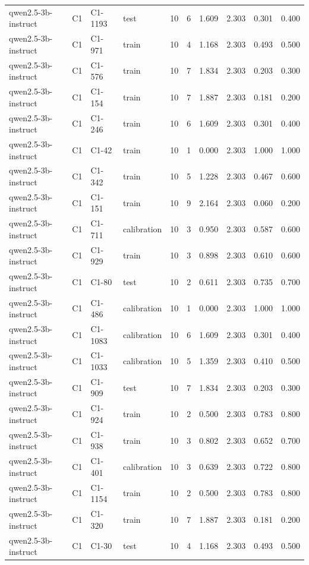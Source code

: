 \begin{table}
\begin{tabular}{llllrrrrrr}
qwen2.5-3b-instruct & C1 & C1-1193 & test & 10 & 6 & 1.609 & 2.303 & 0.301 & 0.400 \\
qwen2.5-3b-instruct & C1 & C1-971 & train & 10 & 4 & 1.168 & 2.303 & 0.493 & 0.500 \\
qwen2.5-3b-instruct & C1 & C1-576 & train & 10 & 7 & 1.834 & 2.303 & 0.203 & 0.300 \\
qwen2.5-3b-instruct & C1 & C1-154 & train & 10 & 7 & 1.887 & 2.303 & 0.181 & 0.200 \\
qwen2.5-3b-instruct & C1 & C1-246 & train & 10 & 6 & 1.609 & 2.303 & 0.301 & 0.400 \\
qwen2.5-3b-instruct & C1 & C1-42 & train & 10 & 1 & 0.000 & 2.303 & 1.000 & 1.000 \\
qwen2.5-3b-instruct & C1 & C1-342 & train & 10 & 5 & 1.228 & 2.303 & 0.467 & 0.600 \\
qwen2.5-3b-instruct & C1 & C1-151 & train & 10 & 9 & 2.164 & 2.303 & 0.060 & 0.200 \\
qwen2.5-3b-instruct & C1 & C1-711 & calibration & 10 & 3 & 0.950 & 2.303 & 0.587 & 0.600 \\
qwen2.5-3b-instruct & C1 & C1-929 & train & 10 & 3 & 0.898 & 2.303 & 0.610 & 0.600 \\
qwen2.5-3b-instruct & C1 & C1-80 & test & 10 & 2 & 0.611 & 2.303 & 0.735 & 0.700 \\
qwen2.5-3b-instruct & C1 & C1-486 & calibration & 10 & 1 & 0.000 & 2.303 & 1.000 & 1.000 \\
qwen2.5-3b-instruct & C1 & C1-1083 & calibration & 10 & 6 & 1.609 & 2.303 & 0.301 & 0.400 \\
qwen2.5-3b-instruct & C1 & C1-1033 & calibration & 10 & 5 & 1.359 & 2.303 & 0.410 & 0.500 \\
qwen2.5-3b-instruct & C1 & C1-909 & test & 10 & 7 & 1.834 & 2.303 & 0.203 & 0.300 \\
qwen2.5-3b-instruct & C1 & C1-924 & train & 10 & 2 & 0.500 & 2.303 & 0.783 & 0.800 \\
qwen2.5-3b-instruct & C1 & C1-938 & train & 10 & 3 & 0.802 & 2.303 & 0.652 & 0.700 \\
qwen2.5-3b-instruct & C1 & C1-401 & calibration & 10 & 3 & 0.639 & 2.303 & 0.722 & 0.800 \\
qwen2.5-3b-instruct & C1 & C1-1154 & train & 10 & 2 & 0.500 & 2.303 & 0.783 & 0.800 \\
qwen2.5-3b-instruct & C1 & C1-320 & train & 10 & 7 & 1.887 & 2.303 & 0.181 & 0.200 \\
qwen2.5-3b-instruct & C1 & C1-30 & test & 10 & 4 & 1.168 & 2.303 & 0.493 & 0.500 \\

\end{tabular}
\end{table}
